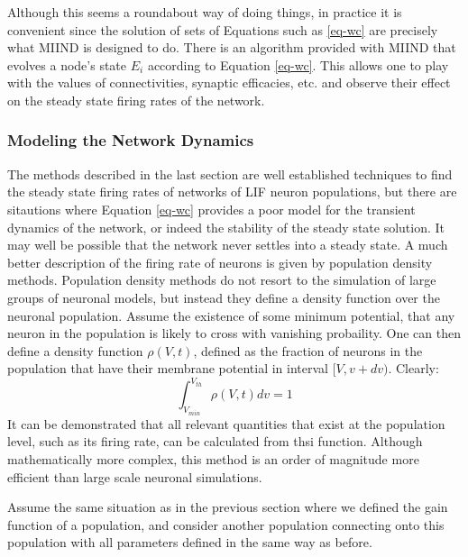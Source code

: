 \documentclass[12pt]{article}
\begin{document}
Although this seems a roundabout way of doing things, in practice it is convenient since the solution of sets of Equations such
as \ref{eq-wc} are precisely what MIIND is designed to do. There is an algorithm provided with MIIND that evolves a node's state
$E_i$ according to Equation \ref{eq-wc}. This allows one to play with the values of connectivities, synaptic efficacies, etc.
and observe their effect on the steady state firing rates of the network.

\subsubsection{Modeling the Network Dynamics}
\label{sec-Fokker-Planck}
The methods described in the last section are well established techniques to find the steady state firing rates
of networks of LIF neuron populations, but there are sitautions where Equation \ref{eq-wc} provides a poor 
model for the transient dynamics of the network, or indeed the stability of the steady state solution. It may well be possible
that the network never settles into a steady state. A much better description of the firing rate of neurons is given
by population density methods. Population density methods do not resort to the simulation of large groups of neuronal models,
but instead they define a density function over the neuronal population. Assume the existence of some minimum potential, that
any neuron in the population is likely to cross with vanishing probaility.
One can then define a density function $\rho(V,t)$, defined as the fraction of neurons in the population that have
their membrane potential in interval $[V, v+ dv)$. Clearly:
\begin{equation}
  \int^{V_{th}}_{V_{min}} \rho(V,t) dv = 1
\end{equation}
It can be demonstrated that all relevant quantities that exist at the population level, such as its firing rate, can be calculated
from thsi function. Although mathematically more complex, this method is an order of magnitude more efficient than large
scale neuronal simulations. 

Assume the same situation as in the previous section where we defined the gain function of a population, and consider another
population connecting onto this population with all parameters defined in the same way as before.
\end{document}
